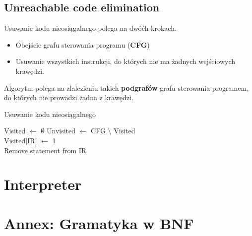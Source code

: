 \documentclass[leqno, 12pt]{article}
\newcommand{\spacing}{\vskip 0.5cm}
\begin{document}
		\newpage

		\subsection{Unreachable code elimination}
		
			Usuwanie kodu nieosiągalnego polega na dwóćh krokach.
			\begin{itemize}
				\item Obejście grafu sterowania programu (\textbf{CFG})
				\item Usuwanie wszystkich instrukcji, do których nie ma żadnych wejściowych krawędzi.
			\end{itemize}
			
			\spacing

			Algorytm polega na zlalezieniu takich \textbf{podgrafów} grafu sterowania programem, do których
			nie prowadzi żadna z krawędzi.
			
			\spacing

			\begin{algorithm}
				\caption{Usuwanie kodu nieosiągalnego}
				\begin{algorithmic}[1]
						\State Visited $\gets$ $\emptyset$
						\State {}
						\State Unvisited $\gets$ CFG $\setminus$ Visited
						\State {}
					\EndProcedure
					\\
						\State Visited[IR] $\gets$ 1
							\State {}
						\EndFor
					\EndProcedure
					\\
							\State Remove statement from IR
						\EndFor
					\EndProcedure
				\end{algorithmic}
			\end{algorithm}

		\newpage

	\section{Interpreter}
		
		
		
		\newpage
	
	\section{Annex: Gramatyka w BNF}
\end{document}
